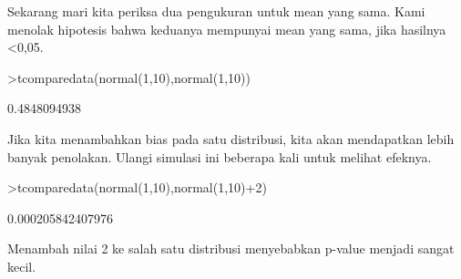 \documentclass[a4paper,10pt]{article}
\begin{document}
\begin{eulernotebook}
\begin{eulercomment}
\begin{eulercomment}
\begin{eulercomment}
Sekarang mari kita periksa dua pengukuran untuk mean yang sama. Kami
menolak hipotesis bahwa keduanya mempunyai mean yang sama, jika
hasilnya \textless{}0,05.
\end{eulercomment}
\begin{eulerprompt}
>tcomparedata(normal(1,10),normal(1,10))
\end{eulerprompt}
\begin{euleroutput}
  0.4848094938
\end{euleroutput}
\begin{eulercomment}
Jika kita menambahkan bias pada satu distribusi, kita akan mendapatkan
lebih banyak penolakan. Ulangi simulasi ini beberapa kali untuk
melihat efeknya.
\end{eulercomment}
\begin{eulerprompt}
>tcomparedata(normal(1,10),normal(1,10)+2)
\end{eulerprompt}
\begin{euleroutput}
  0.000205842407976
\end{euleroutput}
\begin{eulercomment}
Menambah nilai 2 ke salah satu distribusi menyebabkan p-value menjadi
sangat kecil.


\end{eulercomment}
\end{eulercomment}
\end{eulercomment}
\end{eulernotebook}
\end{document}
